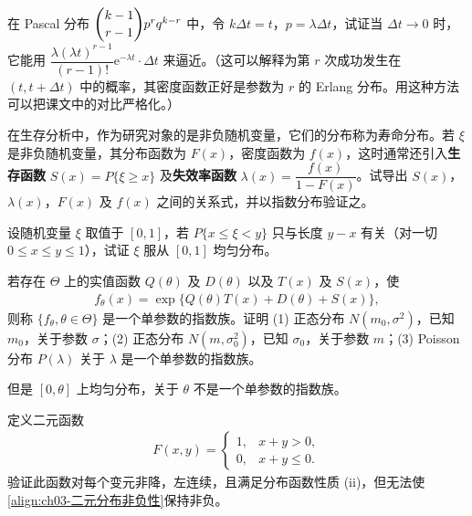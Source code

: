 \documentclass[../../main.tex]{subfiles}
\begin{document}
\begin{exercise}\label{exercise:ch03-08}
在 Pascal 分布 $\dbinom{k-1}{r-1}p^{r}q^{k-r}$ 中，令 $k\Delta t=t$，$p=\lambda\Delta t$，试证当 $\Delta t\to 0$ 时，它能用 $\dfrac{\lambda(\lambda t)^{r-1}}{(r-1)!}\mathrm{e}^{-\lambda t}\cdot\Delta t$ 来逼近。（这可以解释为第 $r$ 次成功发生在 $(t,t+\Delta t)$ 中的概率，其密度函数正好是参数为 $r$ 的 Erlang 分布。用这种方法可以把课文中的对比严格化。）
\end{exercise}

\begin{exercise}\label{exercise:ch03-09}
在生存分析中，作为研究对象的是非负随机变量，它们的分布称为寿命分布。若 $\xi$ 是非负随机变量，其分布函数为 $F(x)$，密度函数为 $f(x)$，这时通常还引入\textbf{生存函数} $S(x)=P\{\xi\geqslant x\}$ 及\textbf{失效率函数} $\lambda(x)=\dfrac{f(x)}{1-F(x)}$。试导出 $S(x)$，$\lambda(x)$，$F(x)$ 及 $f(x)$ 之间的关系式，并以指数分布验证之。
\end{exercise}

\begin{exercise}\label{exercise:ch03-10}
设随机变量 $\xi$ 取值于 $[0,1]$，若 $P\{x\leqslant\xi<y\}$ 只与长度 $y-x$ 有关（对一切 $0\leqslant x\leqslant y\leqslant 1$），试证 $\xi$ 服从 $[0,1]$ 均匀分布。
\end{exercise}

\begin{exercise}\label{exercise:ch03-11}
若存在 $\varTheta$ 上的实值函数 $Q(\theta)$ 及 $D(\theta)$ 以及 $T(x)$ 及 $S(x)$，使
\begin{align*}f_\theta(x)=\exp\{Q(\theta)T(x)+D(\theta)+S(x)\},\end{align*}
则称 $\{f_\theta,\theta\in\varTheta\}$ 是一个单参数的指数族。证明 (1) 正态分布 $N(m_0,\sigma^{2})$，已知 $m_0$，关于参数 $\sigma$；(2) 正态分布 $N(m,\sigma_0^{2})$，已知 $\sigma_0$，关于参数 $m$；(3) Poisson 分布 $P(\lambda)$ 关于 $\lambda$ 是一个单参数的指数族。

但是 $[0,\theta]$ 上均匀分布，关于 $\theta$ 不是一个单参数的指数族。
\end{exercise}

\begin{exercise}\label{exercise:ch03-12}
定义二元函数
\begin{align*}F(x,y)=
\begin{cases}
1, & x+y>0,\\
0, & x+y\leqslant 0.
\end{cases}\end{align*}
验证此函数对每个变元非降，左连续，且满足分布函数性质 (ii)，但无法使\eqref{align:ch03-二元分布非负性}保持非负。
\end{exercise}
\end{document}

